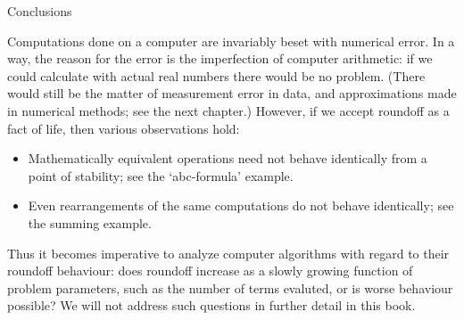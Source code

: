  {Conclusions}

Computations done on a computer are invariably beset with numerical error.
In a way, the reason for the error is the imperfection of computer
arithmetic: if we could calculate with actual real numbers there would
be no problem. (There would still be the matter of measurement error
in data, and approximations made in numerical methods; see the next
chapter.) However, if we accept roundoff as a fact of life, then
various observations hold:
\begin{itemize}
\item Mathematically equivalent operations need not behave identically
  from a point of stability; see the `abc-formula' example.
\item Even rearrangements of the same computations do not behave
  identically; see the summing example.
\end{itemize}
Thus it
becomes imperative to analyze computer algorithms with regard to their
roundoff behaviour: does roundoff increase as a slowly growing
function of problem parameters, such as the number of terms evaluted,
or is worse behaviour possible? We will not address such questions in
further detail in this book.

